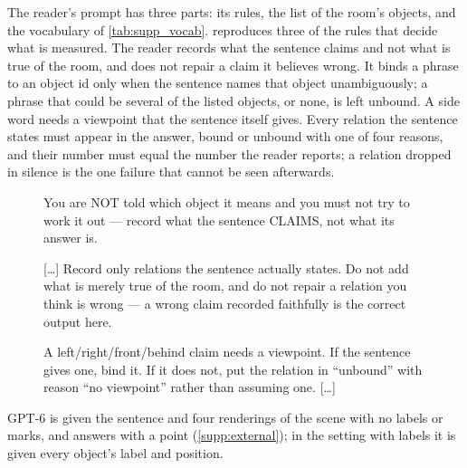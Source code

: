 The reader's prompt has three parts: its rules, the list of the room's objects, and the vocabulary of \cref{tab:supp_vocab}.
 reproduces three of the rules that decide what is measured.
The reader records what the sentence claims and not what is true of the room, and does not repair a claim it believes wrong.
It binds a phrase to an object id only when the sentence names that object unambiguously; a phrase that could be several of the listed objects, or none, is left unbound.
A side word needs a viewpoint that the sentence itself gives.
Every relation the sentence states must appear in the answer, bound or unbound with one of four reasons, and their number must equal the number the reader reports; a relation dropped in silence is the one failure that cannot be seen afterwards.
\begin{figure}[t]
\begin{promptframe}
You are NOT told which object it means and you must not try to work it out --- record what the sentence CLAIMS, not what its answer is.

[\ldots] Record only relations the sentence actually states. Do not add what is merely true of the room, and do not repair a relation you think is wrong --- a wrong claim recorded faithfully is the correct output here.

A left/right/front/behind claim needs a viewpoint. If the sentence gives one, bind it. If it does not, put the relation in ``unbound'' with reason ``no viewpoint'' rather than assuming one. [\ldots]
\end{promptframe}
\end{figure}

GPT-6 is given the sentence and four renderings of the scene with no labels or marks, and answers with a point (\cref{supp:external}); in the setting with labels it is given every object's label and position.

